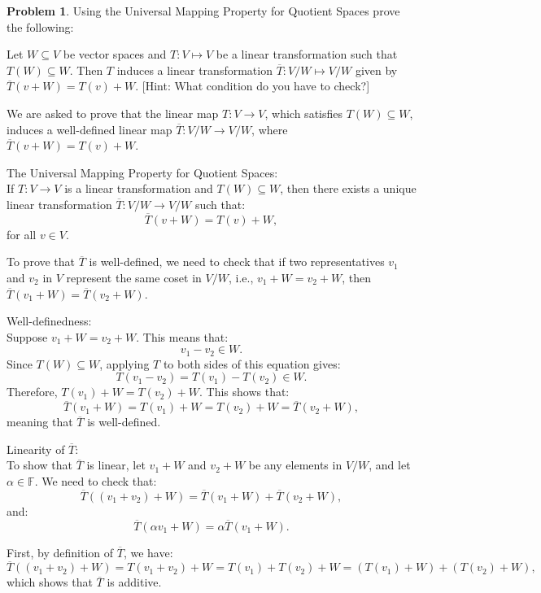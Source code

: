 \documentclass[12pt]{article}
\theoremstyle{definition}
\newtheorem{problem}{Problem}
\begin{document}
\begin{problem}
    Using the Universal Mapping Property for Quotient Spaces prove the following:

    Let $W \subseteq V$ be vector spaces and $T: V \longmapsto V$ be a linear transformation such that $T(W) \subseteq W$. Then $T$ induces a linear transformation $\overline{T}: V/W \longmapsto V/W$ given by $\overline{T}(v + W) = T(v) + W$.
    [Hint: What condition do you have to check?]

    \begin{solution}
        We are asked to prove that the linear map \( T: V \to V \), which satisfies \( T(W) \subseteq W \), induces a well-defined linear map \( \overline{T}: V/W \to V/W \), where \( \overline{T}(v + W) = T(v) + W \).

        The Universal Mapping Property for Quotient Spaces:\\
        If \( T: V \to V \) is a linear transformation and \( T(W) \subseteq W \), then there exists a unique linear transformation \( \overline{T}: V/W \to V/W \) such that:
        \[\overline{T}(v + W) = T(v) + W,\]
        for all \( v \in V \).
    
        To prove that \( \overline{T} \) is well-defined, we need to check that if two representatives \( v_1 \) and \( v_2 \) in \( V \) represent the same coset in \( V/W \), i.e., \( v_1 + W = v_2 + W \), then \( \overline{T}(v_1 + W) = \overline{T}(v_2 + W) \).
    
        Well-definedness:\\
        Suppose \( v_1 + W = v_2 + W \). This means that:
        \[v_1 - v_2 \in W.\]
        Since \( T(W) \subseteq W \), applying \( T \) to both sides of this equation gives:
        \[T(v_1 - v_2) = T(v_1) - T(v_2) \in W.\]
        Therefore, \( T(v_1) + W = T(v_2) + W \). This shows that:
        \[\overline{T}(v_1 + W) = T(v_1) + W = T(v_2) + W = \overline{T}(v_2 + W),\]
        meaning that \( \overline{T} \) is well-defined.
    
        Linearity of \( \overline{T} \):\\
        To show that \( \overline{T} \) is linear, let \( v_1 + W \) and \( v_2 + W \) be any elements in \( V/W \), and let \( \alpha \in \mathbb{F} \). We need to check that:
        \[\overline{T}((v_1 + v_2) + W) = \overline{T}(v_1 + W) + \overline{T}(v_2 + W),\]
        and:
        \[\overline{T}(\alpha v_1 + W) = \alpha \overline{T}(v_1 + W).\]
    
        First, by definition of \( \overline{T} \), we have:
        \[\overline{T}((v_1 + v_2) + W) = T(v_1 + v_2) + W = T(v_1) + T(v_2) + W = (T(v_1) + W) + (T(v_2) + W),\]
        which shows that \( \overline{T} \) is additive.
    

\end{solution}
\end{problem}
\end{document}
